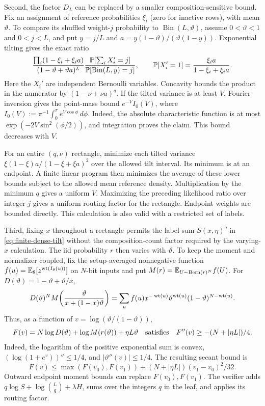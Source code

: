 Second, the factor $D_L$ can be replaced by a smaller
composition-sensitive bound. Fix an assignment of reference probabilities
$\xi_i$ (zero for inactive rows), with mean $\vartheta$. To compare its
shuffled weight-$j$ probability to $\operatorname{Bin}(L,\vartheta)$,
assume $0<\vartheta<1$ and $0<j<L$, and put
$y=j/L$ and $a=y(1-\vartheta)/(\vartheta(1-y))$.
Exponential tilting gives the exact ratio
\[
 \frac{\prod_i(1-\xi_i+\xi_i a)}
      {(1-\vartheta+\vartheta a)^L}
 \frac{\mathbb P[\sum_i X_i'=j]}{\mathbb P[\operatorname{Bin}(L,y)=j]},
 \qquad
 \mathbb P[X_i'=1]=\frac{\xi_i a}{1-\xi_i+\xi_i a}.
\]
Here the $X_i'$ are independent Bernoulli variables.
Concavity bounds the product in the numerator by
$(1-\nu+\nu a)^q$. If the tilted variance is at least $V$, Fourier
inversion gives the point-mass bound $e^{-V}I_0(V)$, where
$I_0(V):=\pi^{-1}\int_0^\pi e^{V\cos\phi}\,d\phi$.
Indeed, the absolute
characteristic function is at most
$\exp(-2V\sin^2(\phi/2))$, and integration proves the claim.
This bound decreases with $V$.

For an entire $(q,\nu)$ rectangle, minimize each tilted variance
$\xi(1-\xi)a/(1-\xi+\xi a)^2$ over the allowed tilt interval. Its minimum
is at an endpoint. A finite linear program then minimizes the average of
these lower bounds subject to the allowed mean reference density.
Multiplication by the minimum $q$ gives a uniform $V$.
Maximizing the preceding likelihood ratio over integer $j$ gives a
uniform routing factor for the rectangle. Endpoint weights are bounded
directly. This calculation is also valid with a restricted set of labels.

Third, fixing $x$ throughout a rectangle permits the label sum
$S(x,\eta)^q$ in \eqref{eq:finite-dense-tilt} without the
composition-count factor required by the varying-$x$ calculation.
The iid probability $r$ then varies with $\vartheta$.
To keep the moment and normalizer coupled, fix the setup-averaged
nonnegative function $f(u)=\mathbb E_\theta[z^{\operatorname{wt}(I_\theta(u))}]$ on $N$-bit inputs
and put $M(r)=\mathbb E_{U\sim\mathrm{Bern}(r)^N}f(U)$. For
$D(\vartheta)=1-\vartheta+\vartheta/x$,
\[
 D(\vartheta)^N M\!\left(\frac{\vartheta}{x+(1-x)\vartheta}\right)
 =\sum_u f(u)x^{-\operatorname{wt}(u)}
          \vartheta^{\operatorname{wt}(u)}(1-\vartheta)^{N-\operatorname{wt}(u)}.
\]
Thus, as a function of $v=\log(\vartheta/(1-\vartheta))$,
\[
 F(v)=N\log D(\vartheta)+\log M(r(\vartheta))+\eta L\vartheta
 \quad\hbox{satisfies}\quad F''(v)\ge-(N+|\eta L|)/4.
\]
Indeed, the logarithm of the positive exponential sum is convex,
$(\log(1+e^v))''\le1/4$, and $|\vartheta''(v)|\le1/4$.
The resulting secant bound is
\[
 F(v)\le\max(F(v_0),F(v_1))
           +(N+|\eta L|)(v_1-v_0)^2/32.
\]
Outward endpoint moment bounds can replace $F(v_0),F(v_1)$.
The verifier adds $q\log S+\log\binom Lq+\lambda H$, sums over the
integers $q$ in the leaf, and applies its routing factor.


